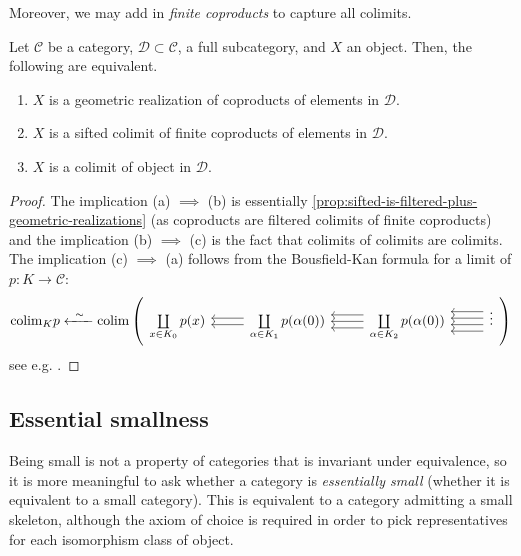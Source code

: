 Moreover, we may add in \emph{finite coproducts} to capture all colimits.
\def\cC{\mathcal{C}}
\def\cD{\mathcal{D}}
\begin{proposition}\label{prop:colimit-is-sifted-plus-finite-coproducts}
  Let $\cC$ be a category, $\cD \subset \cC$, a full subcategory, and $X$ an object.
  Then, the following are equivalent.
  \begin{enumerate}[label={(\alph*)}]
    \item $X$ is a geometric realization of coproducts of elements in $\cD$.
    \item $X$ is a sifted colimit of finite coproducts of elements in $\cD$.
    \item $X$ is a colimit of object in $\cD$.
  \end{enumerate}
\end{proposition}
\begin{proof}
  The implication (a) $\implies$ (b) is essentially \autoref{prop:sifted-is-filtered-plus-geometric-realizations} (as coproducts are filtered colimits of finite coproducts) and the implication (b) $\implies$ (c) is the fact that colimits of colimits are colimits.
  The implication (c) $\implies$ (a) follows from the Bousfield-Kan formula for a limit of $p\colon K \rightarrow \cC$:
  \[
    \colim_K p \xleftarrow{\;\;\sim\;\;} \colim \left(
\begin{tikzcd}
	{\coprod\limits_{x \in K_0} p(x)} & {\coprod\limits_{\alpha \in K_1} p(\alpha(0))} & {\coprod\limits_{\alpha \in K_2} p(\alpha(0))} & \vdots
	\arrow[shift left, from=1-2, to=1-1]
	\arrow[shift right, from=1-2, to=1-1]
	\arrow[from=1-3, to=1-2]
	\arrow[shift right=2, from=1-3, to=1-2]
	\arrow[shift left=2, from=1-3, to=1-2]
	\arrow[shift left, from=1-4, to=1-3]
	\arrow[shift right, from=1-4, to=1-3]
	\arrow[shift left=3, from=1-4, to=1-3]
	\arrow[shift right=3, from=1-4, to=1-3]
\end{tikzcd}
    \right)
  \] 
  see e.g. \cite[Cor~12.5]{Shah}.
\end{proof}
\subsection{Essential smallness}

Being small is not a property of categories that is invariant under equivalence, so it is more meaningful to ask whether a category is \textit{essentially small} (whether it is equivalent to a small category). This is equivalent to a category admitting a small skeleton, although the axiom of choice is required in order to pick representatives for each isomorphism class of object.

